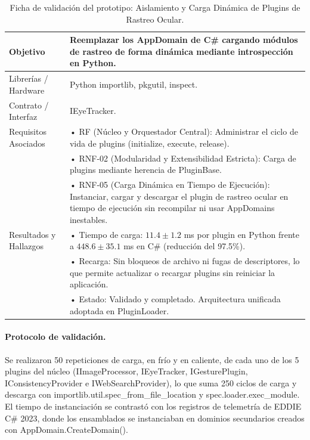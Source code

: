 \begin{table}[H]
    \centering
    \caption{Ficha de validación del prototipo: Aislamiento y Carga Dinámica de Plugins de Rastreo Ocular.}
    \label{tab:ficha_f11}
    \begin{tabular}{L{3.2cm} L{11.0cm}}
        \toprule
        Objetivo & Reemplazar los AppDomain de C\# cargando módulos de rastreo de forma dinámica mediante introspección en Python. \\ \midrule
        Librerías / Hardware & Python importlib, pkgutil, inspect. \\ \midrule
        Contrato / Interfaz & IEyeTracker. \\ \midrule
        Requisitos Asociados &
        • RF (Núcleo y Orquestador Central): Administrar el ciclo de vida de plugins (initialize, execute, release). \vspace{0.1cm} \\
        & • RNF-02 (Modularidad y Extensibilidad Estricta): Carga de plugins mediante herencia de PluginBase. \vspace{0.1cm} \\
        & • RNF-05 (Carga Dinámica en Tiempo de Ejecución): Instanciar, cargar y descargar el plugin de rastreo ocular en tiempo de ejecución sin recompilar ni usar AppDomains inestables. \\ \midrule
        Resultados y Hallazgos &
        • Tiempo de carga: $11.4 \pm 1.2$ ms por plugin en Python frente a $448.6 \pm 35.1$ ms en C\# (reducción del 97.5\%). \vspace{0.1cm} \\
        & • Recarga: Sin bloqueos de archivo ni fugas de descriptores, lo que permite actualizar o recargar plugins sin reiniciar la aplicación. \vspace{0.1cm} \\
        & • Estado: Validado y completado. Arquitectura unificada adoptada en PluginLoader. \\ \bottomrule
    \end{tabular}
\end{table}
 
\paragraph{Protocolo de validación.} Se realizaron 50 repeticiones de carga, en frío y en caliente, de cada uno de los 5 plugins del núcleo (IImageProcessor, IEyeTracker, IGesturePlugin, IConsistencyProvider e IWebSearchProvider), lo que suma 250 ciclos de carga y descarga con importlib.util.spec\_from\_file\_location y spec.loader.exec\_module. El tiempo de instanciación se contrastó con los registros de telemetría de EDDIE C\# 2023, donde los ensamblados se instanciaban en dominios secundarios creados con AppDomain.CreateDomain().
 
